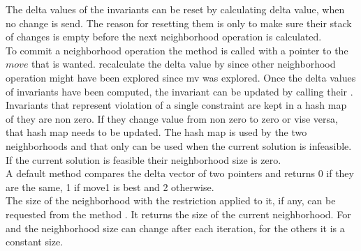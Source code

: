 The delta values of the invariants can be reset by calculating delta value, when no change is send. The reason for 
resetting them is only to make sure their stack of changes is empty before the next neighborhood operation is 
calculated. \\ 
To commit a neighborhood operation the method  is called with a pointer to the 
 $move$ that is wanted.  recalculate the delta value 
by  since other neighborhood operation might have been explored since mv was 
explored. Once the delta values of invariants have been computed, the invariant can be updated by calling their 
. Invariants that represent violation of a single constraint are kept in a hash map of they are 
non zero. If they change value from non zero to zero or vise versa, that hash map needs to be updated. The hash map is 
used by the two neighborhoods  and  that only can be used when the 
current solution is infeasible. If the current solution is feasible their neighborhood size is zero. \\
A default method  compares the delta vector of two  pointers and returns 
0 if they are the same, 1 if move1 is best and 2 otherwise. \\ 
The size of the neighborhood with the restriction applied to it, if any, can be requested from the 
method . It returns the size of the current neighborhood. For  and 
 the neighborhood size can change after each iteration, for the others it is a constant 
size. \\ 




